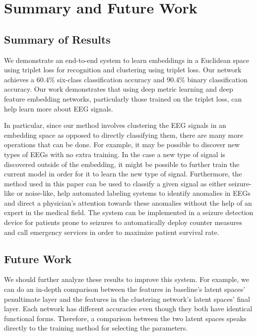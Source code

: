 \chapter{Summary and Future Work}

\section*{Summary of Results}
We demonstrate an end-to-end system to learn embeddings in a Euclidean space using triplet loss for recognition and clustering using triplet loss. Our network achieves a $60.4\%$ six-class classification accuracy and 90.4\% binary classification accuracy. Our work demonstrates that using deep metric learning and deep feature embedding networks, particularly those trained on the triplet loss, can help learn more about EEG signals. 

In particular, since our method involves clustering the EEG signals in an embedding space as opposed to directly classifying them, there are many more operations that can be done. For example, it may be possible to discover new types of EEGs with no extra training. In the case a new type of signal is discovered outside of the embedding, it might be possible to further train the current model in order for it to learn the new type of signal. Furthermore, the method used in this paper can be used to classify a given signal as either seizure-like or noise-like, help automated labeling systems to identify anomalies in EEGs and direct a physician's attention towards these anomalies without the help of an expert in the medical field. The system can be implemented in a seizure detection device for patients prone to seizures to automatically deploy counter measures and call emergency services in order to maximize patient survival rate.

\section*{Future Work}

We should further analyze these results to improve this system. For example, we can do an in-depth comparison between the features in baseline's latent spaces' penultimate layer and the features in the clustering network's latent spaces' final layer. Each network has different accuracies even though they both have identical functional forms. Therefore, a comparison between the two latent spaces speaks directly to the training method for selecting the parameters. 

